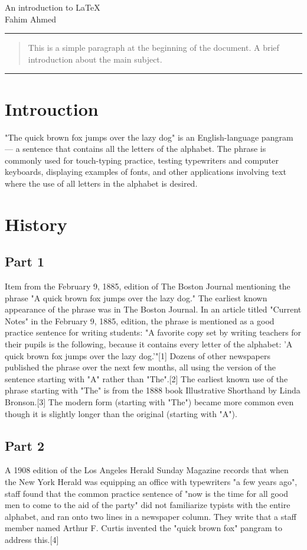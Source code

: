 \documentclass[12pt, letterpaper]{article}
\begin{document}
\begin{center}
    \huge{An introduction to \LaTeX}\\[10pt]
    \large{Fahim Ahmed}
\end{center}
\rule{\textwidth}{0.5pt}

\begin{abstract}
    \noindent This is a simple paragraph at the beginning of the document. A brief introduction about the main subject.

\end{abstract}
\rule{\textwidth}{0.5pt}


\section{Introuction}

"The quick brown fox jumps over the lazy dog" is an English-language pangram — a sentence that contains all the letters of the alphabet. The phrase is commonly used for touch-typing practice, testing typewriters and computer keyboards, displaying examples of fonts, and other applications involving text where the use of all letters in the alphabet is desired.

\section{History}
\subsection{Part 1}
Item from the February 9, 1885, edition of The Boston Journal mentioning the phrase "A quick brown fox jumps over the lazy dog."
The earliest known appearance of the phrase was in The Boston Journal. In an article titled "Current Notes" in the February 9, 1885, edition, the phrase is mentioned as a good practice sentence for writing students: "A favorite copy set by writing teachers for their pupils is the following, because it contains every letter of the alphabet: 'A quick brown fox jumps over the lazy dog.'"[1] Dozens of other newspapers published the phrase over the next few months, all using the version of the sentence starting with "A" rather than "The".[2] The earliest known use of the phrase starting with "The" is from the 1888 book Illustrative Shorthand by Linda Bronson.[3] The modern form (starting with "The") became more common even though it is slightly longer than the original (starting with "A").

\subsection{Part 2}
A 1908 edition of the Los Angeles Herald Sunday Magazine records that when the New York Herald was equipping an office with typewriters "a few years ago", staff found that the common practice sentence of "now is the time for all good men to come to the aid of the party" did not familiarize typists with the entire alphabet, and ran onto two lines in a newspaper column. They write that a staff member named Arthur F. Curtis invented the "quick brown fox" pangram to address this.[4]
\end{document}
